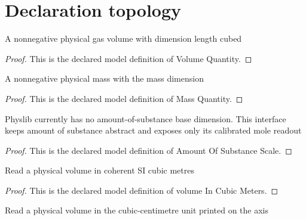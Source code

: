 \section{Declaration topology}
\begin{definition}
  \label{def:physics:phyx-mini-0368:phyxminiproblems-problemphyxmini0368-volumequantity}
  A nonnegative physical gas volume with dimension length cubed
\end{definition}
\begin{proof}
  This is the declared model definition of Volume Quantity.
\end{proof}
\begin{definition}
  \label{def:physics:phyx-mini-0368:phyxminiproblems-problemphyxmini0368-massquantity}
  A nonnegative physical mass with the mass dimension
\end{definition}
\begin{proof}
  This is the declared model definition of Mass Quantity.
\end{proof}
\begin{definition}
  \label{def:physics:phyx-mini-0368:phyxminiproblems-problemphyxmini0368-amountofsubstancescale}
  Physlib currently has no amount-of-substance base dimension. This interface keeps amount of substance abstract and exposes only its calibrated mole readout
\end{definition}
\begin{proof}
  This is the declared model definition of Amount Of Substance Scale.
\end{proof}
\begin{definition}
  \label{def:physics:phyx-mini-0368:phyxminiproblems-problemphyxmini0368-volumeincubicmeters}
  Read a physical volume in coherent SI cubic metres
\end{definition}
\begin{proof}
  This is the declared model definition of volume In Cubic Meters.
\end{proof}
\begin{definition}
  \label{def:physics:phyx-mini-0368:phyxminiproblems-problemphyxmini0368-volumeincubiccentimeters}
  Read a physical volume in the cubic-centimetre unit printed on the axis
\end{definition}
